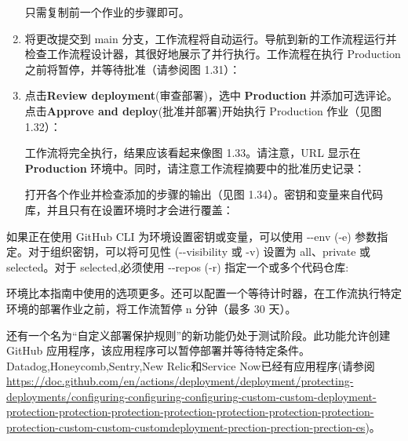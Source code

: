 \begin{enumerate}
只需复制前一个作业的步骤即可。

\item 
将更改提交到 main 分支，工作流程将自动运行。导航到新的工作流程运行并检查工作流程设计器，其很好地展示了并行执行。工作流程在执行 Production 之前将暂停，并等待批准（请参阅图 1.31）：


\item 
点击\textbf{Review deployment}(审查部署)，选中 \textbf{Production} 并添加可选评论。点击\textbf{Approve and deploy}(批准并部署)开始执行 Production 作业（见图 1.32）：


工作流将完全执行，结果应该看起来像图 1.33。请注意，URL 显示在 \textbf{Production} 环境中。同时，请注意工作流程摘要中的批准历史记录：


打开各个作业并检查添加的步骤的输出（见图 1.34）。密钥和变量来自代码库，并且只有在设置环境时才会进行覆盖：


\end{enumerate}


如果正在使用 GitHub CLI 为环境设置密钥或变量，可以使用 -{}-env (-e) 参数指定。对于组织密钥，可以将可见性 (-{}-visibility 或 -v) 设置为 all、private 或 selected。对于 selected,必须使用 -{}-repos (-r) 指定一个或多个代码仓库:


环境比本指南中使用的选项更多。还可以配置一个等待计时器，在工作流执行特定环境的部署作业之前，将工作流暂停 n 分钟（最多 30 天）。

还有一个名为“自定义部署保护规则”的新功能仍处于测试阶段。此功能允许创建 GitHub 应用程序，该应用程序可以暂停部署并等待特定条件。 Datadog,Honeycomb,Sentry,New Relic和Service Now已经有应用程序(请参阅\url{https://doc.github.com/en/actions/deployment/deployment/protecting-deployments/configuring-configuring-configuring-custom-custom-deployment-protection-protection-protection-protection-protection-protection-protection-protection-custom-custom-customdeployment-prection-prection-prection-es})。

